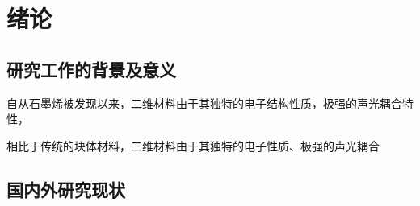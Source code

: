\chapter{绪\hspace{6pt}论}

\section{研究工作的背景及意义}
自从石墨烯被发现以来，二维材料由于其独特的电子结构性质，极强的声光耦合特性，

相比于传统的块体材料，二维材料由于其独特的电子性质、极强的声光耦合


\section{国内外研究现状}